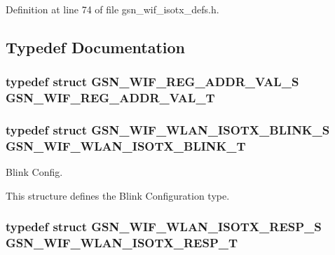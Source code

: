 Definition at line 74 of file gsn\_\-wif\_\-isotx\_\-defs.h.



\subsection{Typedef Documentation}
\hypertarget{a00611_a906005e2909b6c0c567780b355483f49}{
\subsubsection[{GSN\_\-WIF\_\-REG\_\-ADDR\_\-VAL\_\-T}]{\setlength{\rightskip}{0pt plus 5cm}typedef struct {\bf GSN\_\-WIF\_\-REG\_\-ADDR\_\-VAL\_\-S} {\bf GSN\_\-WIF\_\-REG\_\-ADDR\_\-VAL\_\-T}}}
\label{a00611_a906005e2909b6c0c567780b355483f49}
\hypertarget{a00611_aa5106f5574b37c3ad57646e430fd02cd}{
\subsubsection[{GSN\_\-WIF\_\-WLAN\_\-ISOTX\_\-BLINK\_\-T}]{\setlength{\rightskip}{0pt plus 5cm}typedef struct {\bf GSN\_\-WIF\_\-WLAN\_\-ISOTX\_\-BLINK\_\-S}  {\bf GSN\_\-WIF\_\-WLAN\_\-ISOTX\_\-BLINK\_\-T}}}
\label{a00611_aa5106f5574b37c3ad57646e430fd02cd}


Blink Config. 

This structure defines the Blink Configuration type. \hypertarget{a00611_ab22302300b256ca3328249fa728e3bb7}{
\subsubsection[{GSN\_\-WIF\_\-WLAN\_\-ISOTX\_\-RESP\_\-T}]{\setlength{\rightskip}{0pt plus 5cm}typedef struct {\bf GSN\_\-WIF\_\-WLAN\_\-ISOTX\_\-RESP\_\-S}  {\bf GSN\_\-WIF\_\-WLAN\_\-ISOTX\_\-RESP\_\-T}}}
\label{a00611_ab22302300b256ca3328249fa728e3bb7}


